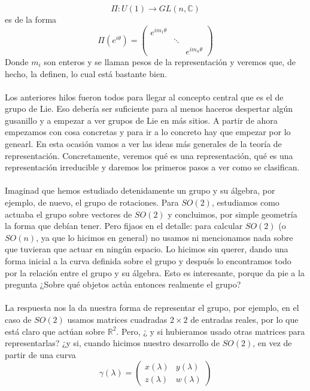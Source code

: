 \documentclass[12pt]{article}
\begin{document}
$$\Pi: U(1)\rightarrow GL(n, \mathbb{C})$$ 
es de la forma
\begin{equation}
    \Pi(e^{i\theta})= \begin{pmatrix}
        e^{im_1\theta} & &  \\
        & \ddots &   \\
        & & e^{im_n\theta}
    \end{pmatrix}
\end{equation}
Donde $m_i$ son enteros y se llaman pesos  de la representación y veremos que, de hecho, la definen, lo cual está bastante bien. 
\\\\
\noindent Los anteriores hilos fueron todos para llegar al concepto central que es el de grupo de Lie. Eso debería ser suficiente para al menos haceros despertar algún gusanillo y a empezar a ver grupos de Lie en más sitios.  A partir de ahora empezamos con cosa concretas y para ir a lo concreto hay que empezar por lo genearl. En esta ocasión vamos a ver las ideas más generales de la teoría de representación. Concretamente, veremos qué es una representación, qué es una representación irreducible y daremos los primeros pasos a ver como se clasifican. \\\\
\noindent Imaginad que hemos estudiado detenidamente un grupo y su álgebra, por ejemplo, de nuevo, el grupo de rotaciones. Para $SO(2)$, estudiamos como actuaba el grupo sobre vectores de $SO(2)$ y concluimos, por simple geometría la forma que debían tener. Pero fijaos en el detalle: para calcular $SO(2)$ (o $SO(n)$, ya que lo hicimos en general) no usamos ni mencionamos nada sobre que tuvieran que actuar en ningún espacio. Lo hicimos sin querer, dando una forma inicial a la curva definida sobre el grupo y después lo encontramos todo por la relación entre el grupo y su álgebra. Esto es interesante, porque da pie a la pregunta ¿Sobre qué objetos actúa entonces realmente el grupo? \\\\
La respuesta nos la da nuestra forma de representar el grupo, por ejemplo, en el caso de $SO(2)$ usamos matrices cuadradas $2\times 2$ de entradas reales, por lo que está claro que actúan sobre $\mathbb{R}^2$. Pero, ¿ y si hubieramos usado otras matrices para representarlas? ¿y si, cuando hicimos nuestro desarrollo de $SO(2)$, en vez de partir de una curva 
$$\gamma(\lambda)= \begin{pmatrix}
	x(\lambda) & y(\lambda) \\
	z(\lambda) & w(\lambda)
\end{pmatrix}$$
\end{document}
